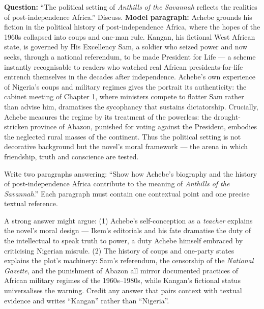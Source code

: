 \documentclass[11pt]{article}
\begin{document}
\begin{exoresolu}
\textbf{Question:} ``The political setting of \emph{Anthills of the Savannah} reflects the realities of post-independence Africa.'' Discuss.
\tcblower
\textbf{Model paragraph:} Achebe grounds his fiction in the political history of post-independence Africa, where the hopes of the 1960s collapsed into coups and one-man rule. Kangan, his fictional West African state, is governed by His Excellency Sam, a soldier who seized power and now seeks, through a national referendum, to be made President for Life --- a scheme instantly recognisable to readers who watched real African presidents-for-life entrench themselves in the decades after independence. Achebe's own experience of Nigeria's coups and military regimes gives the portrait its authenticity: the cabinet meeting of Chapter 1, where ministers compete to flatter Sam rather than advise him, dramatises the sycophancy that sustains dictatorship. Crucially, Achebe measures the regime by its treatment of the powerless: the drought-stricken province of Abazon, punished for voting against the President, embodies the neglected rural masses of the continent. Thus the political setting is not decorative background but the novel's moral framework --- the arena in which friendship, truth and conscience are tested.
\end{exoresolu}

\begin{exercice}
Write two paragraphs answering: ``Show how Achebe's biography and the history of post-independence Africa contribute to the meaning of \emph{Anthills of the Savannah}.'' Each paragraph must contain one contextual point and one precise textual reference.
\end{exercice}

\begin{corrige}
A strong answer might argue: (1) Achebe's self-conception as a \emph{teacher} explains the novel's moral design --- Ikem's editorials and his fate dramatise the duty of the intellectual to speak truth to power, a duty Achebe himself embraced by criticising Nigerian misrule. (2) The history of coups and one-party states explains the plot's machinery: Sam's referendum, the censorship of the \emph{National Gazette}, and the punishment of Abazon all mirror documented practices of African military regimes of the 1960s--1980s, while Kangan's fictional status universalises the warning. Credit any answer that pairs context with textual evidence and writes ``Kangan'' rather than ``Nigeria''.
\end{corrige}
\end{document}

